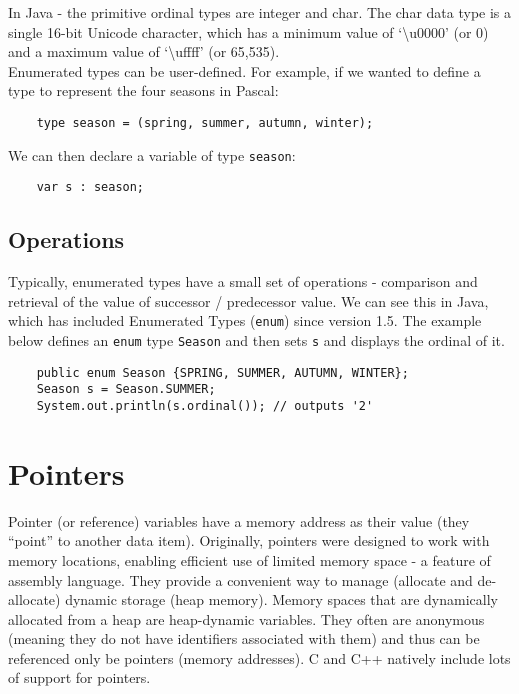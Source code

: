 In Java - the primitive ordinal types are integer and char. The char data type is a single 16-bit Unicode character, which has a minimum value of `\textbackslash u0000' (or 0) and a maximum value of `\textbackslash uffff' (or 65,535). \\

Enumerated types can be user-defined. For example, if we wanted to define a type to represent the four seasons in Pascal:
\begin{verbatim}
    type season = (spring, summer, autumn, winter);
\end{verbatim}
We can then declare a variable of type \verb|season|:
\begin{verbatim}
    var s : season;
\end{verbatim}

\subsection{Operations}
Typically, enumerated types have a small set of operations - comparison and retrieval of the value of successor / predecessor value. We can see this in Java, which has included Enumerated Types (\verb|enum|) since version 1.5. The example below defines an \verb|enum| type \verb|Season| and then sets \verb|s| and displays the ordinal of it.
\begin{verbatim}
    public enum Season {SPRING, SUMMER, AUTUMN, WINTER};
    Season s = Season.SUMMER;
    System.out.println(s.ordinal()); // outputs '2'
\end{verbatim}

\section{Pointers}
Pointer (or reference) variables have a memory address as their value (they ``point'' to another data item). Originally, pointers were designed to work with memory locations, enabling efficient use of limited memory space - a feature of assembly language. They provide a convenient way to manage (allocate and de-allocate) dynamic storage (heap memory). Memory spaces that are dynamically allocated from a heap are heap-dynamic variables. They often are anonymous (meaning they do not have identifiers associated with them) and thus can be referenced only be pointers (memory addresses). C and C++ natively include lots of support for pointers.

